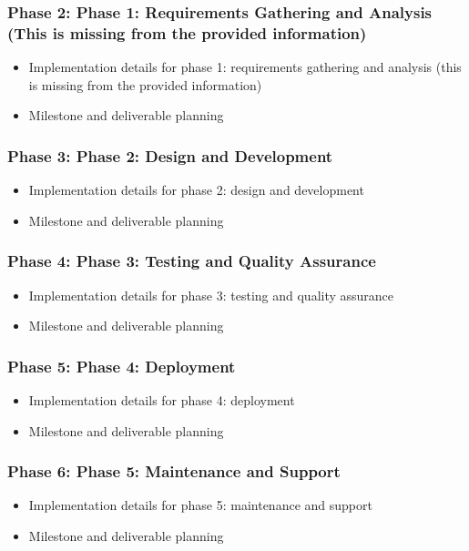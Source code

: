 \documentclass[11pt,a4paper,oneside]{article}
\begin{document}
\subsubsection{Phase 2: Phase 1: Requirements Gathering and Analysis (This is missing from the provided information)}
\begin{itemize}
\item Implementation details for phase 1: requirements gathering and analysis (this is missing from the provided information)
\item Milestone and deliverable planning
\end{itemize}

\subsubsection{Phase 3: Phase 2: Design and Development}
\begin{itemize}
\item Implementation details for phase 2: design and development
\item Milestone and deliverable planning
\end{itemize}

\subsubsection{Phase 4: Phase 3: Testing and Quality Assurance}
\begin{itemize}
\item Implementation details for phase 3: testing and quality assurance
\item Milestone and deliverable planning
\end{itemize}

\subsubsection{Phase 5: Phase 4: Deployment}
\begin{itemize}
\item Implementation details for phase 4: deployment
\item Milestone and deliverable planning
\end{itemize}

\subsubsection{Phase 6: Phase 5: Maintenance and Support}
\begin{itemize}
\item Implementation details for phase 5: maintenance and support
\item Milestone and deliverable planning
\end{itemize}
\end{document}
